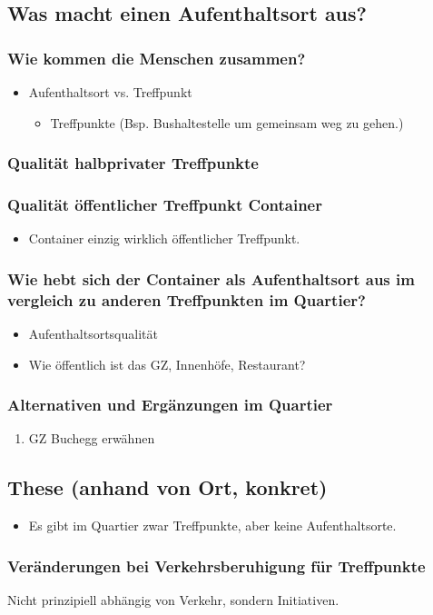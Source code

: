 \documentclass[a4paper,ngerman,11pt]{scrartcl}
\begin{document}
\subsection{Was macht einen Aufenthaltsort aus?}
\label{sec-3-4}
\subsubsection{Wie kommen die Menschen zusammen?}
\label{sec-3-4-1}
\begin{itemize}
\item Aufenthaltsort vs. Treffpunkt
\begin{itemize}
\item Treffpunkte (Bsp. Bushaltestelle um gemeinsam weg zu gehen.)
\end{itemize}
\end{itemize}
\subsubsection{Qualität halbprivater Treffpunkte}
\label{sec-3-4-2}
\subsubsection{Qualität öffentlicher Treffpunkt Container}
\label{sec-3-4-3}
\begin{itemize}
\item Container einzig wirklich öffentlicher Treffpunkt.
\end{itemize}
\subsubsection{Wie hebt sich der Container als Aufenthaltsort aus im vergleich zu anderen Treffpunkten im Quartier?}
\label{sec-3-4-4}
\begin{itemize}
\item Aufenthaltsortsqualität
\item Wie öffentlich ist das GZ, Innenhöfe, Restaurant?
\end{itemize}
\subsubsection{Alternativen und Ergänzungen im Quartier}
\label{sec-3-4-5}
\begin{enumerate}
\item GZ Buchegg erwähnen
\label{sec-3-4-5-1}
\end{enumerate}

\subsection{These (anhand von Ort, konkret)}
\label{sec-3-5}
\begin{itemize}
\item Es gibt im Quartier zwar Treffpunkte, aber keine Aufenthaltsorte.
\end{itemize}
\subsubsection{Veränderungen bei Verkehrsberuhigung für Treffpunkte}
\label{sec-3-5-1}
Nicht prinzipiell abhängig von Verkehr, sondern Initiativen.
\end{document}
